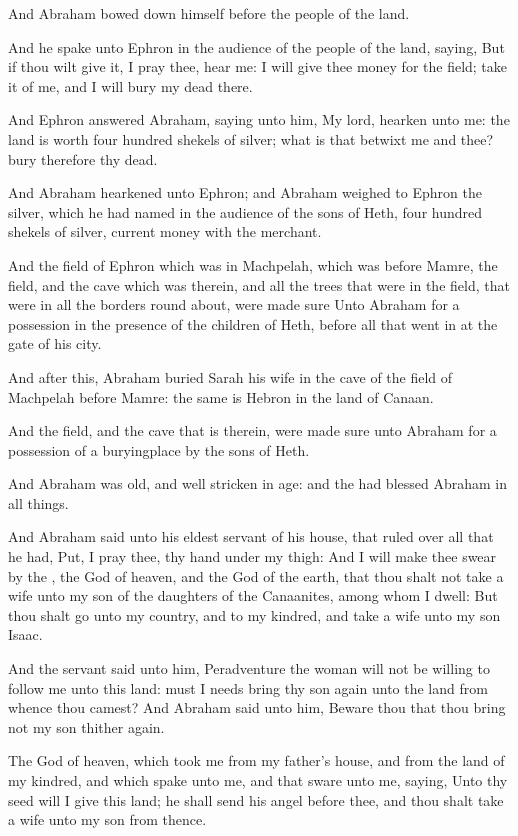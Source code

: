 \Verse And Abraham bowed down himself before the people of the land.

\Verse And he spake unto Ephron in the audience of the people of the land, saying, But if thou wilt give it, I pray thee, hear me: I will give thee money for the field; take it of me, and I will bury my dead there.

\Verse And Ephron answered Abraham, saying unto him, \Verse My lord, hearken unto me: the land is worth four hundred shekels of silver; what is that betwixt me and thee? bury therefore thy dead.

\Verse And Abraham hearkened unto Ephron; and Abraham weighed to Ephron the silver, which he had named in the audience of the sons of Heth, four hundred shekels of silver, current money with the merchant.

\Verse And the field of Ephron which was in Machpelah, which was before Mamre, the field, and the cave which was therein, and all the trees that were in the field, that were in all the borders round about, were made sure \Verse Unto Abraham for a possession in the presence of the children of Heth, before all that went in at the gate of his city.

\Verse And after this, Abraham buried Sarah his wife in the cave of the field of Machpelah before Mamre: the same is Hebron in the land of Canaan.

\Verse And the field, and the cave that is therein, were made sure unto Abraham for a possession of a buryingplace by the sons of Heth.

\Chapter
\Verse And Abraham was old, and well stricken in age: and the \LORD had blessed Abraham in all things.

\Verse And Abraham said unto his eldest servant of his house, that ruled over all that he had, Put, I pray thee, thy hand under my thigh: \Verse And I will make thee swear by the \LORD, the God of heaven, and the God of the earth, that thou shalt not take a wife unto my son of the daughters of the Canaanites, among whom I dwell: \Verse But thou shalt go unto my country, and to my kindred, and take a wife unto my son Isaac.

\Verse And the servant said unto him, Peradventure the woman will not be willing to follow me unto this land: must I needs bring thy son again unto the land from whence thou camest?  \Verse And Abraham said unto him, Beware thou that thou bring not my son thither again.

\Verse The \LORD God of heaven, which took me from my father's house, and from the land of my kindred, and which spake unto me, and that sware unto me, saying, Unto thy seed will I give this land; he shall send his angel before thee, and thou shalt take a wife unto my son from thence.

